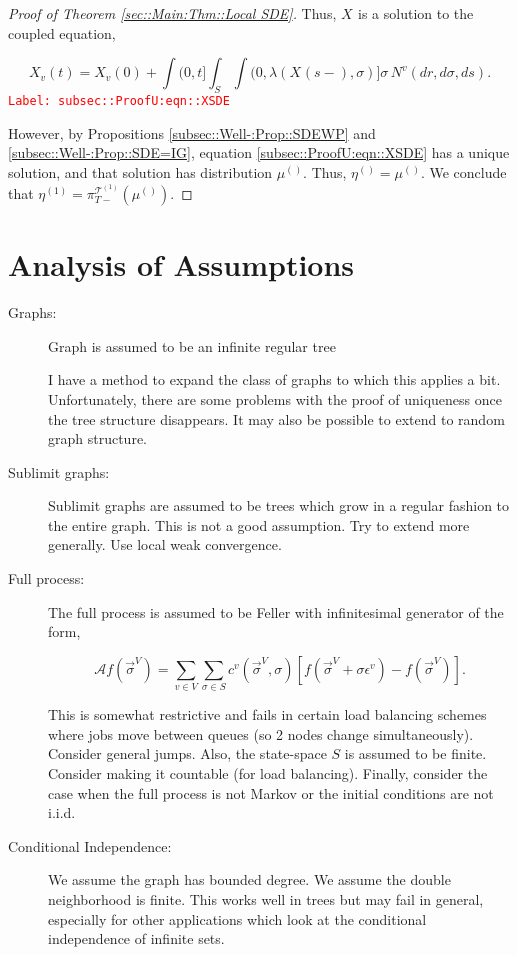 \documentclass[12pt]{article}
\newcommand{\mc}{\mathcal}
\newcommand{\ep}{\epsilon}
\newcommand{\tr}{\textcolor{red}}
\newcommand{\labe}[1]{\tr{\texttt{Label: #1}}}
\renewcommand{\v}{v}							%
\renewcommand{\S}{S}							%
\newcommand{\s}{\sigma}							%
\newcommand{\sv}{\vec{\s}}						%
\newcommand{\ev}{\ep}							%
\newcommand{\T}{T}								%
\renewcommand{\t}{t}							%
\newcommand{\proj}{\pi}							%
\renewcommand{\tt}{s}							%
\newcommand{\X}{X}								%
\newcommand{\IG}{\mc{A}}						%
\newcommand{\IGr}{c}							%
\newcommand{\vind}[1]{^{#1}}					%
\newcommand{\vsi}[1]{^{#1}}						%
\newcommand{\cind}[1]{_{#1}}					%
\newcommand{\tp}[1]{(#1)}						%
\newcommand{\tip}[1]{#1}						%
\newcommand{\ts}[1]{_{#1}}						%
\newcommand{\tree}{\mc{T}}						%
\newcommand{\sln}[1]{^{(#1)}}					%
\newcommand{\poiss}{N}							%
\newcommand{\rate}{\lambda}						%
\renewcommand{\r}{r}							%
\newcommand{\m}{\mu}							%
\newcommand{\mmm}{\eta}							%
\begin{document}
\begin{proof}[Proof of Theorem \ref{sec::Main:Thm::Local SDE}]
Thus, \(\X\cind{}\tip{}\) is a solution to the coupled equation,

\begin{equation}
\X\cind{\v}\tp{\t} = \X\cind{\v}\tp{0} + \int{(0,\t]}\int_\S \int{(0,\rate{}(\X\cind{}\tp{\tt-},\s)]}\s\,\poiss\vind{\v}(d\r,d\s,d\tt).
\label{subsec::ProofU:eqn::XSDE}
\end{equation}
\labe{subsec::ProofU:eqn::XSDE}

However, by Propositions \ref{subsec::Well-:Prop::SDEWP} and \ref{subsec::Well-:Prop::SDE=IG}, equation \eqref{subsec::ProofU:eqn::XSDE} has a unique solution, and that solution has distribution \(\m\sln{}\ts{}\). Thus, \(\mmm\sln{}\ts{} = \m\sln{}\ts{}\). We conclude that \(\mmm\sln{1}\ts{} = \proj\vsi{\tree\sln{1}}\ts{\T-}(\m\sln{}\ts{})\).

\end{proof}

\section{Analysis of Assumptions}

\begin{description}
\item[Graphs: ] Graph is assumed to be an infinite regular tree

I have a method to expand the class of graphs to which this applies a bit. Unfortunately, there are some problems with the proof of uniqueness once the tree structure disappears. It may also be possible to extend to random graph structure.

\item[Sublimit graphs: ] Sublimit graphs are assumed to be trees which grow in a regular fashion to the entire graph. This is not a good assumption. Try to extend more generally. Use local weak convergence.

\item[Full process: ] The full process is assumed to be Feller with infinitesimal generator of the form,

\[\IG f(\sv\cind{}\vsi{V}) = \sum_{\v \in V}\sum_{\s \in \S} \IGr\vind{\v}(\sv\cind{}\vsi{V},\s)[f(\sv\cind{}\vsi{V} + \s \ev\vind{\v}) - f(\sv\cind{}\vsi{V})].\]

This is somewhat restrictive and fails in certain load balancing schemes where jobs move between queues (so 2 nodes change simultaneously). Consider general jumps. Also, the state-space \(\S\) is assumed to be finite. Consider making it countable (for load balancing). Finally, consider the case when the full process is not Markov or the initial conditions are not i.i.d.

\item[Conditional Independence: ] We assume the graph has bounded degree. We assume the double neighborhood is finite. This works well in trees but may fail in general, especially for other applications which look at the conditional independence of infinite sets.
\end{description}
\end{document}
